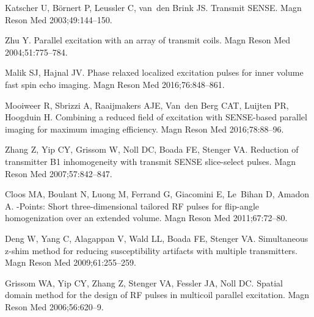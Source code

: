 \documentclass[11pt]{article}
\begin{document}
\pagebreak


%

\begin{thebibliography}{10}
\providecommand{\url}[1]{\texttt{#1}}
\providecommand{\urlprefix}{URL }

Katscher U, B{\"o}rnert P, Leussler C, van~den Brink JS.
\newblock Transmit {SENSE}.
\newblock Magn Reson Med 2003;\hspace{0pt}49:144--150.

Zhu Y.
\newblock Parallel excitation with an array of transmit coils.
\newblock Magn Reson Med 2004;\hspace{0pt}51:775--784.

Malik SJ, Hajnal JV.
\newblock Phase relaxed localized excitation pulses for inner volume fast spin
  echo imaging.
\newblock Magn Reson Med 2016;\hspace{0pt}76:848--861.

Mooiweer R, Sbrizzi A, Raaijmakers AJE, Van~den Berg CAT, Luijten PR, Hoogduin
  H.
\newblock Combining a reduced field of excitation with {SENSE}-based parallel
  imaging for maximum imaging efficiency.
\newblock Magn Reson Med 2016;\hspace{0pt}78:88--96.

Zhang Z, Yip CY, Grissom W, Noll DC, Boada FE, Stenger VA.
\newblock Reduction of transmitter {B1} inhomogeneity with transmit {SENSE}
  slice-select pulses.
\newblock Magn Reson Med 2007;\hspace{0pt}57:842--847.

Cloos MA, Boulant N, Luong M, Ferrand G, Giacomini E, Le~Bihan D, Amadon A.
-{Points}: {Short} three-dimensional tailored {RF} pulses for
  flip-angle homogenization over an extended volume.
\newblock Magn Reson Med 2011;\hspace{0pt}67:72--80.

Deng W, Yang C, Alagappan V, Wald LL, Boada FE, Stenger VA.
\newblock Simultaneous z-shim method for reducing susceptibility artifacts with
  multiple transmitters.
\newblock Magn Reson Med 2009;\hspace{0pt}61:255--259.

Grissom WA, Yip CY, Zhang Z, Stenger VA, Fessler JA, Noll DC.
\newblock Spatial domain method for the design of {RF} pulses in multicoil
  parallel excitation.
\newblock Magn Reson Med 2006;\hspace{0pt}56:620--9.


\end{thebibliography}
\end{document}
